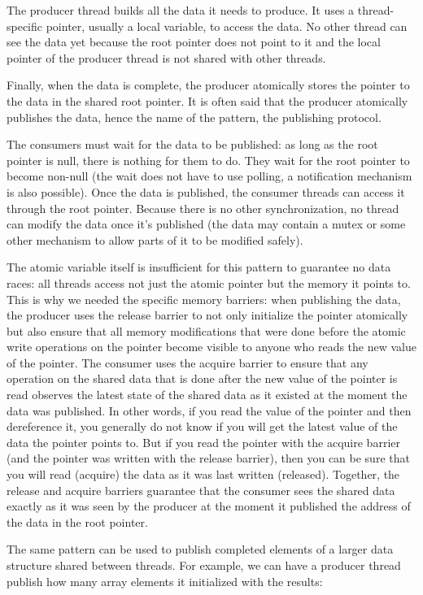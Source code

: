 The producer thread builds all the data it needs to produce. It uses a thread-specific pointer, usually a local variable, to access the data. No other thread can see the data yet because the root pointer does not point to it and the local pointer of the producer thread is not shared with other threads.

Finally, when the data is complete, the producer atomically stores the pointer to the data in the shared root pointer. It is often said that the producer atomically publishes the data, hence the name of the pattern, the publishing protocol.

The consumers must wait for the data to be published: as long as the root pointer is null, there is nothing for them to do. They wait for the root pointer to become non-null (the wait does not have to use polling, a notification mechanism is also possible). Once the data is published, the consumer threads can access it through the root pointer. Because there is no other synchronization, no thread can modify the data once it's published (the data may contain a mutex or some other mechanism to allow parts of it to be modified safely).

The atomic variable itself is insufficient for this pattern to guarantee no data races: all threads access not just the atomic pointer but the memory it points to. This is why we needed the specific memory barriers: when publishing the data, the producer uses the release barrier to not only initialize the pointer atomically but also ensure that all memory modifications that were done before the atomic write operations on the pointer become visible to anyone who reads the new value of the pointer. The consumer uses the acquire barrier to ensure that any operation on the shared data that is done after the new value of the pointer is read observes the latest state of the shared data as it existed at the moment the data was published. In other words, if you read the value of the pointer and then dereference it, you generally do not know if you will get the latest value of the data the pointer points to. But if you read the pointer with the acquire barrier (and the pointer was written with the release barrier), then you can be sure that you will read (acquire) the data as it was last written (released). Together, the release and acquire barriers guarantee that the consumer sees the shared data exactly as it was seen by the producer at the moment it published the address of the data in the root pointer.

The same pattern can be used to publish completed elements of a larger data structure shared between threads. For example, we can have a producer thread publish how many array elements it initialized with the results:

